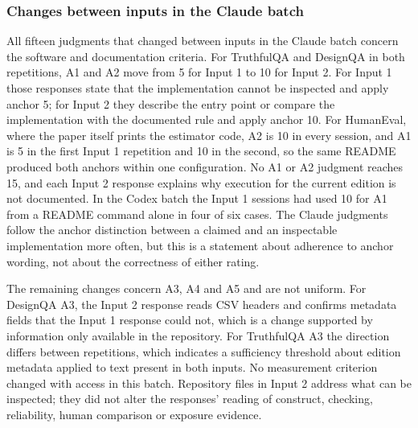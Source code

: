 \subsubsection{Changes between inputs in the Claude batch}
All fifteen judgments that changed between inputs in the Claude batch concern the software and documentation criteria. For TruthfulQA and DesignQA in both repetitions, A1 and A2 move from 5 for Input 1 to 10 for Input 2. For Input 1 those responses state that the implementation cannot be inspected and apply anchor 5; for Input 2 they describe the entry point or compare the implementation with the documented rule and apply anchor 10. For HumanEval, where the paper itself prints the estimator code, A2 is 10 in every session, and A1 is 5 in the first Input 1 repetition and 10 in the second, so the same README produced both anchors within one configuration. No A1 or A2 judgment reaches 15, and each Input 2 response explains why execution for the current edition is not documented. In the Codex batch the Input 1 sessions had used 10 for A1 from a README command alone in four of six cases. The Claude judgments follow the anchor distinction between a claimed and an inspectable implementation more often, but this is a statement about adherence to anchor wording, not about the correctness of either rating.

The remaining changes concern A3, A4 and A5 and are not uniform. For DesignQA A3, the Input 2 response reads CSV headers and confirms metadata fields that the Input 1 response could not, which is a change supported by information only available in the repository. For TruthfulQA A3 the direction differs between repetitions, which indicates a sufficiency threshold about edition metadata applied to text present in both inputs. No measurement criterion changed with access in this batch. Repository files in Input 2 address what can be inspected; they did not alter the responses' reading of construct, checking, reliability, human comparison or exposure evidence.
